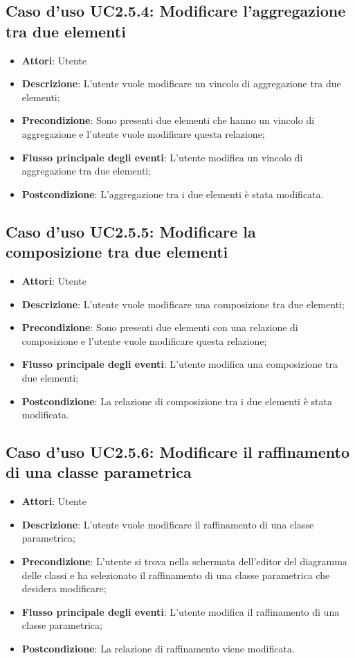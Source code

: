 \documentclass[../AnalisiDeiRequisiti.tex]{subfiles}
\begin{document}
		\subsection{Caso d'uso UC2.5.4: Modificare l'aggregazione tra due elementi}
		\begin{itemize}
			\item \textbf{Attori}: Utente
			\item \textbf{Descrizione}: L'utente vuole modificare un vincolo di aggregazione tra due elementi;
			\item \textbf{Precondizione}: Sono presenti due elementi che hanno un vincolo di aggregazione e l'utente vuole modificare questa relazione;
			\item \textbf{Flusso principale degli eventi}: L'utente modifica un vincolo di aggregazione tra due elementi;
			\item \textbf{Postcondizione}: L'aggregazione tra i due elementi è stata modificata.
		\end{itemize}
		\subsection{Caso d'uso UC2.5.5: Modificare la composizione tra due elementi}
		\begin{itemize}
			\item \textbf{Attori}: Utente
			\item \textbf{Descrizione}: L'utente vuole modificare una composizione tra due elementi;
			\item \textbf{Precondizione}: Sono presenti due elementi con una relazione di composizione e l'utente vuole modificare questa relazione;
			\item \textbf{Flusso principale degli eventi}: L'utente modifica una composizione tra due elementi;
			\item \textbf{Postcondizione}: La relazione di composizione tra i due elementi è stata modificata.	
		\end{itemize}
		\subsection{Caso d'uso UC2.5.6: Modificare il raffinamento di una classe parametrica}
		\begin{itemize}
			\item \textbf{Attori}: Utente
			\item \textbf{Descrizione}: L'utente vuole modificare il raffinamento di una classe parametrica;
			\item \textbf{Precondizione}: L'utente si trova nella schermata dell'editor del diagramma delle classi e ha selezionato il raffinamento di una classe parametrica che desidera modificare;
			\item \textbf{Flusso principale degli eventi}: L'utente modifica il raffinamento di una classe parametrica;
			\item \textbf{Postcondizione}: La relazione di raffinamento viene modificata.
		\end{itemize}
\end{document}

